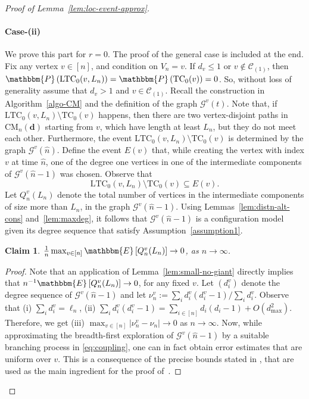\documentclass[11pt,a4paper, reqno]{article}
\numberwithin{equation}{section}
\numberwithin{equation}{section}
\def\sss{\scriptscriptstyle}
\newcommand{\prob}[1]{\ensuremath{\mathbbm{P}\left(#1\right)}}
\newcommand{\expt}[1]{\ensuremath{\mathbbm{E}\left[#1\right]}}
\newcommand{\1}{\ensuremath{\mathbbm{1}}}
\newcommand{\CM}{\ensuremath{\mathrm{CM}_n(\boldsymbol{d})}}
\newcommand{\TC}{\mathrm{TC}}
\newcommand{\LTC}{\mathrm{LTC}}
\newtheorem{claim}{Claim}
\newenvironment{claimproof}{\begin{proof}\renewcommand{\qedsymbol}{\claimqed}}{\end{proof}\renewcommand{\qedsymbol}{\plainqed}}
\let\plainqed\qedsymbol
\newcommand{\claimqed}{$\lrcorner$}
\numberwithin{equation}{section}
\numberwithin{theorem}{section}
\begin{document}
\begin{proof}[{Proof of Lemma~\ref{lem:loc-event-approx}}]
\paragraph*{Case-(ii)}
We prove this part for $r=0$. 
The proof of the general case is included at the end.
Fix any vertex $v\in [n]$, and condition on $V_n=v$. 
If $d_v\leq 1$ or $v\notin\mathscr{C}_{\sss (1)}$, then $\prob{\LTC_0(v,L_n)} = \prob{\TC_0(v)} = 0$.
So, without loss of generality assume that $d_v>1$ and $v\in \mathscr{C}_{\sss (1)}$. 
Recall the construction in Algorithm~\ref{algo-CM} and the definition of the graph $\mathcal{G}^v(t)$.
Note that, if $\LTC_0(v,L_n)\setminus \TC_0(v)$ happens, then there are two vertex-disjoint paths in $\CM$ starting from $v$, which have length at least $L_n$, but they do not meet each other.
 Furthermore, the event $\mathrm{LTC}_0(v,L_n)\setminus \mathrm{TC}_0(v)$ is determined by the graph $\mathcal{G}^v(\hat{n})$.
 Define the event $E(v)$ that, while creating the vertex with index $v$ at time $\hat{n}$, one of the degree one vertices in one of the intermediate components of $\mathcal{G}^v(\hat{n}-1)$ was chosen.
 Observe that 
 $$\mathrm{LTC}_0(v,L_n)\setminus \mathrm{TC}_0(v)\subseteq E(v).$$
Let $Q_n^v(L_n)$ denote the total number of vertices in the intermediate components of size more than $L_n$, in the graph $\mathcal{G}^v(\hat{n}-1)$. 
Using Lemmas~\ref{lem:distn-alt-cons} and~\ref{lem:maxdeg}, it follows that $\mathcal{G}^v(\hat{n}-1)$ is a configuration model given its degree sequence that satisfy Assumption~\ref{assumption1}.
\begin{claim}\label{claim:uniform-v} $\frac{1}{n}\max_{v\in [n]}\expt{Q_n^v(L_n)}\to 0$, as $n\to\infty$.
\end{claim}
\begin{claimproof}
 Note that an application of Lemma~\ref{lem:small-no-giant} directly implies that  $n^{-1}\expt{Q_n^v(L_n)}\to 0$, for any fixed $v$. Let $(d_i^v)$ denote the degree sequence of $\mathcal{G}^v(\hat{n}-1)$ and let $\nu_n^{v}:= \sum_i d_i^v(d_i^v-1)/\sum_{i} d_i^v$. Observe that 
 (i) $\sum_id_i^v = \ell_n$, (ii) $\sum_id_i^v(d_i^v-1) = \sum_{i\in [n]}d_i(d_i-1)+O(d_{\max}^2)$. Therefore, we get (iii) $\max_{v\in [n]} |\nu_n^v-\nu_n|\to 0$ as $n\to\infty$. 
Now, while approximating the breadth-first exploration of $\mathcal{G}^v(\hat{n}-1)$ by a suitable branching process in \eqref{eq:coupling}, one can in fact obtain error estimates that are uniform over $v$. 
This is a consequence of the precise bounds stated in \cite[Lemma 5.6]{RGCN2}, that are used as the main ingredient for the proof of~\cite[Proposition~5.4]{RGCN2}.

\end{claimproof}
\end{proof}
\end{document}
